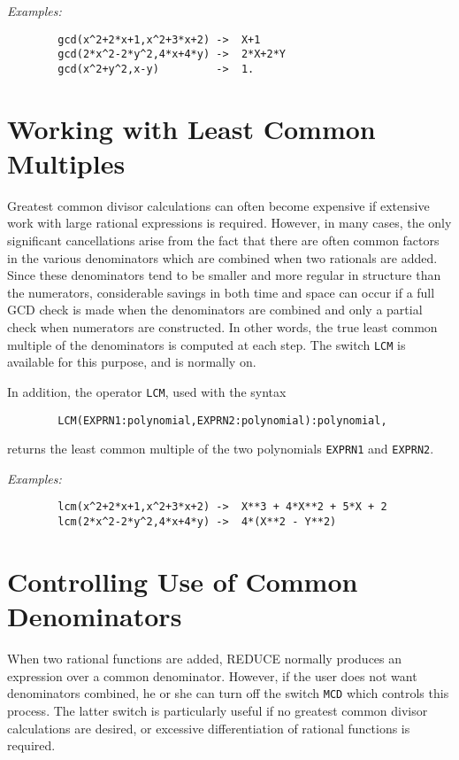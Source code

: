 \documentclass[11pt,letterpaper]{book}
\makeatletter
\newcommand{\REDUCE}{REDUCE}
\newcommand{\underscore}{\_}
\newcommand{\ttindex}[1]{{\renewcommand{\_}{\protect\underscore}%
                          \index{#1@{\tt #1}}}}
\makeatother
\begin{document}
{\it Examples:}
{\small\begin{verbatim}
        gcd(x^2+2*x+1,x^2+3*x+2) ->  X+1
        gcd(2*x^2-2*y^2,4*x+4*y) ->  2*X+2*Y
        gcd(x^2+y^2,x-y)         ->  1.
\end{verbatim}}

\section{Working with Least Common Multiples}

Greatest common divisor calculations can often become expensive if
extensive work with large rational expressions is required. However, in
many cases, the only significant cancellations arise from the fact that
there are often common factors in the various denominators which are
combined when two rationals are added. Since these denominators tend to be
smaller and more regular in structure than the numerators, considerable
savings in both time and space can occur if a full GCD check is made when
the denominators are combined and only a partial check when numerators are
constructed. In other words, the true least common multiple of the
denominators is computed at each step. The switch {\tt LCM}\ttindex{LCM}
is available for this purpose, and is normally on.

In addition, the operator {\tt LCM},\ttindex{LCM} used with the syntax
{\small\begin{verbatim}
        LCM(EXPRN1:polynomial,EXPRN2:polynomial):polynomial,
\end{verbatim}}
returns the least common multiple of the two polynomials {\tt EXPRN1} and
{\tt EXPRN2}.

{\it Examples:}
{\small\begin{verbatim}
        lcm(x^2+2*x+1,x^2+3*x+2) ->  X**3 + 4*X**2 + 5*X + 2
        lcm(2*x^2-2*y^2,4*x+4*y) ->  4*(X**2 - Y**2)
\end{verbatim}}

\section{Controlling Use of Common Denominators}

When two rational functions are added, {\REDUCE} normally produces an
expression over a common denominator. However, if the user does not want
denominators combined, he or she can turn off the switch {\tt MCD}
\ttindex{MCD} which controls this process.  The latter switch is
particularly useful if no greatest common divisor calculations are
desired, or excessive differentiation of rational functions is required.
\end{document}
